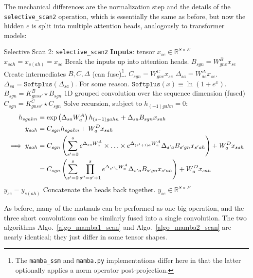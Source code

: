 The mechanical differences are the normalization step and the details of the
\texttt{selective\_scan2} operation, which is essentially the same as before, but now the hidden $ e
$ is split into multiple attention heads, analogously to transformer models:

\begin{algo}{Selective Scan 2: \texttt{selective\_scan2} }
\State \textbf{Inputs}: tensor $ x _{ se }\in \mathbb{R}^{ S\times E } $
\State $ x _{ sah } = x _{ s(ah) } = x_{ se } $  \Comment Break the inputs up into attention heads.
\State $ B _{ sgn } = W ^{ B }_{ gne }x _{ se } $  \Comment Create intermediates $B, C, \Delta  $ (can
fuse)\footnote{The \texttt{mamba\_ssm} and \texttt{mamba.py} implementations differ here in that the
latter optionally applies a norm operator post-projection.}.
\State $ C _{ sgn } = W ^{ C }_{ gne }x _{ se } $
\State $ \Delta  _{ sa } = W ^{ \Delta   }_{ ae } x _{ se } $.
\State $ \Delta  _{ sa } = \texttt{Softplus} \left (\Delta _{ sa }\right ) $. \Comment For some reason. $ \texttt{Softplus}(x) \equiv \ln \left ( 1+ e^{ x } \right ) $.
\State $ B _{ sgn } = K ^{ B } _{ gnss' }\star B_{ sgn}$ \Comment 1D grouped convolution over the sequence dimension (fused)
\State $ C _{ sgn } = K ^{ C } _{ gnss' }\star C_{ sgn }$
\State Solve recursion, subject to $ h _{ (-1)gahn }=0 $:
\begin{align}
    h _{ sgahn } &= \exp \left ( \Delta  _{ sa } W^{A} _{ a } \right ) h _{ (s-1)gah n} + \Delta _{ sa }B _{ sgn }x _{ sah }\nonumber\\
    y _{ sah } &= C _{ sgn }h _{ sgahn } +  W ^{ D } _{ a }x _{ sah } \nonumber\\
    \implies y _{ sah } &= C _{ sgn }\left (\sum _{ s'=0 }^{ s }e^{ \Delta _{ sa }W^{A} _{ a } }\times \ldots \times e^{ \Delta _{ (s'+1)a }W^{A} _{ a } } \Delta _{ s'a }B _{ s'gn } x _{ s'ah }\right ) + W ^{ D } _{ a } x _{ sah }\nonumber\\
   &= C _{ sgn }\left (\sum _{ s'=0 }^{ s }\prod_{ s''=s'+1 }^{ s  }e^{ \Delta _{ s''a }W^{A} _{ a } } \Delta _{ s'a }B _{ s'gn } x _{ s'ah }\right ) + W ^{ D } _{ a } x _{ sah }
\end{align}
\State $ y _{ se } = y _{ s(ah) } $  \Comment Concatenate the heads back together.
\State \Return $ y _{ se } \in \mathbb{R}^{ S\times E }$
\label{algo_mamba2_scan}
\end{algo}
As before, many of the matmuls can be performed as one big operation, and the three short
convolutions can be similarly fused into a single convolution. The two algorithms
Algo.~\ref{algo_mamba1_scan} and Algo.~\ref{algo_mamba2_scan} are nearly identical; they just differ
in some tensor shapes.


